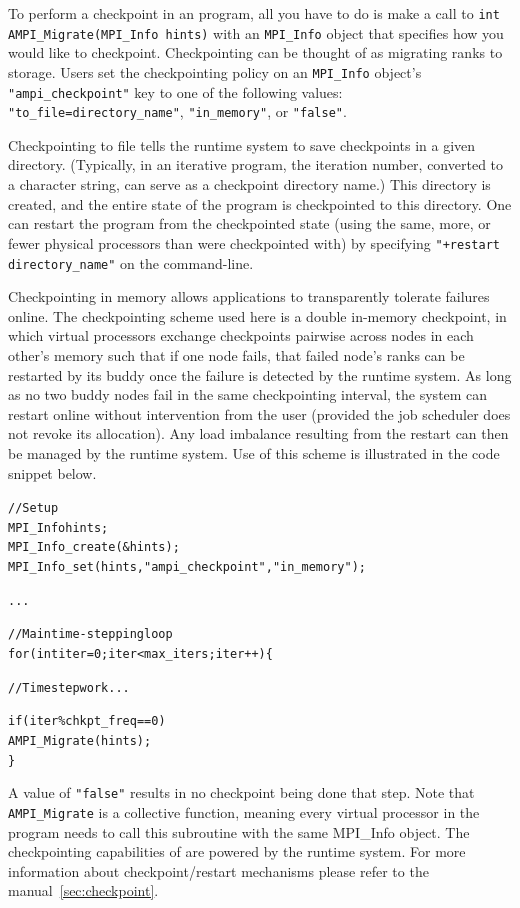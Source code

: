\documentclass[10pt]{article}
\begin{document}
To perform a checkpoint in an \ampi{} program, all you have to do is make a call
to \texttt{int AMPI\_Migrate(MPI\_Info hints)} with an \texttt{MPI\_Info} object that
specifies how you would like to checkpoint. Checkpointing can be thought of as
migrating \ampi{} ranks to storage. Users set the checkpointing policy
on an \texttt{MPI\_Info} object's \texttt{"ampi\_checkpoint"} key to one of the
following values: \texttt{"to\_file=directory\_name"}, \texttt{"in\_memory"},
or \texttt{"false"}.

Checkpointing to file tells the runtime system to save checkpoints in a given
directory. (Typically, in an iterative program, the iteration number, converted to a
character string, can serve as a checkpoint directory name.) This directory
is created, and the entire state of the program is checkpointed to this directory.
One can restart the program from the checkpointed state (using the same, more, or
fewer physical processors than were checkpointed with) by specifying \texttt{"+restart
directory\_name"} on the command-line.

Checkpointing in memory allows applications to transparently tolerate failures online.
The checkpointing scheme used here is a double in-memory checkpoint, in which
virtual processors exchange checkpoints pairwise across nodes in each other's memory
such that if one node fails, that failed node's \ampi{} ranks can be restarted by its
buddy once the failure is detected by the runtime system. As long as no two buddy
nodes fail in the same checkpointing interval, the system can restart online without
intervention from the user (provided the job scheduler does not revoke its allocation).
Any load imbalance resulting from the restart can then be managed by the runtime system.
Use of this scheme is illustrated in the code snippet below.

\begin{alltt}
// Setup
MPI_Info hints;
MPI_Info_create(&hints);
MPI_Info_set(hints, "ampi_checkpoint", "in_memory");

...

// Main time-stepping loop
for (int iter=0; iter < max_iters; iter++) \{

  // Time step work ...

  if (iter \% chkpt_freq == 0)
    AMPI_Migrate(hints);
\}
\end{alltt}

A value of \texttt{"false"} results in no checkpoint being done that step.
Note that \texttt{AMPI\_Migrate} is a collective function, meaning every
virtual processor in the program needs to call this subroutine with the
same MPI\_Info object. The checkpointing capabilities of \ampi{} are powered by
the \charmpp{} runtime system. For more information about checkpoint/restart
mechanisms please refer to the \charmpp{} manual~\ref{sec:checkpoint}.
\end{document}
